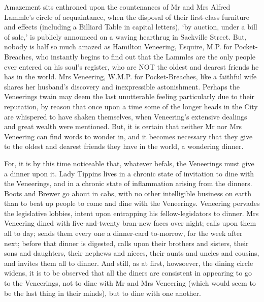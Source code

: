 Amazement sits enthroned upon the countenances of Mr and Mrs Alfred
Lammle’s circle of acquaintance, when the disposal of their first-class
furniture and effects (including a Billiard Table in capital letters),
‘by auction, under a bill of sale,’ is publicly announced on a waving
hearthrug in Sackville Street. But, nobody is half so much amazed as
Hamilton Veneering, Esquire, M.P. for Pocket-Breaches, who instantly
begins to find out that the Lammles are the only people ever entered on
his soul’s register, who are NOT the oldest and dearest friends he has
in the world. Mrs Veneering, W.M.P. for Pocket-Breaches, like a faithful
wife shares her husband’s discovery and inexpressible astonishment.
Perhaps the Veneerings twain may deem the last unutterable feeling
particularly due to their reputation, by reason that once upon a time
some of the longer heads in the City are whispered to have shaken
themselves, when Veneering’s extensive dealings and great wealth were
mentioned. But, it is certain that neither Mr nor Mrs Veneering can
find words to wonder in, and it becomes necessary that they give to the
oldest and dearest friends they have in the world, a wondering dinner.

For, it is by this time noticeable that, whatever befals, the Veneerings
must give a dinner upon it. Lady Tippins lives in a chronic state
of invitation to dine with the Veneerings, and in a chronic state of
inflammation arising from the dinners. Boots and Brewer go about in
cabs, with no other intelligible business on earth than to beat up
people to come and dine with the Veneerings. Veneering pervades the
legislative lobbies, intent upon entrapping his fellow-legislators to
dinner. Mrs Veneering dined with five-and-twenty bran-new faces over
night; calls upon them all to day; sends them every one a dinner-card
to-morrow, for the week after next; before that dinner is digested,
calls upon their brothers and sisters, their sons and daughters, their
nephews and nieces, their aunts and uncles and cousins, and invites
them all to dinner. And still, as at first, howsoever, the dining circle
widens, it is to be observed that all the diners are consistent in
appearing to go to the Veneerings, not to dine with Mr and Mrs Veneering
(which would seem to be the last thing in their minds), but to dine with
one another.

